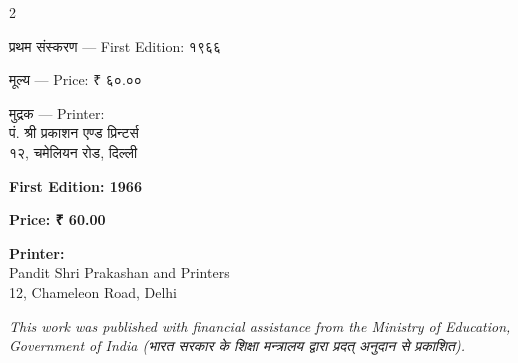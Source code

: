 \documentclass[11pt,a4paper]{article}
\newcommand{\dev}[1]{{\devanagarifont #1}}
\newcommand{\devbold}[1]{{\devanagarifontbold #1}}
\begin{document}
\vspace{0.5cm}

\begin{paracol}{2}
\begin{leftcolumn*}
\begin{center}
\devbold{प्रथम संस्करण — First Edition: १९६६}

\devbold{मूल्य — Price: ₹ ६०.००}

\devbold{मुद्रक — Printer:}\\
\dev{पं. श्री प्रकाशन एण्ड प्रिन्टर्स}\\
\dev{१२, चमेलियन रोड, दिल्ली}
\end{center}
\end{leftcolumn*}

\begin{rightcolumn}
\begin{center}
\textbf{First Edition: 1966}

\textbf{Price: ₹ 60.00}

\textbf{Printer:}\\
Pandit Shri Prakashan and Printers\\
12, Chameleon Road, Delhi
\end{center}
\end{rightcolumn}
\end{paracol}

\vspace{0.5cm}

\textit{This work was published with financial assistance from the Ministry of Education, Government of India (\dev{भारत सरकार के शिक्षा मन्त्रालय द्वारा प्रदत् अनुदान से प्रकाशित}).}

\newpage
\end{document}
